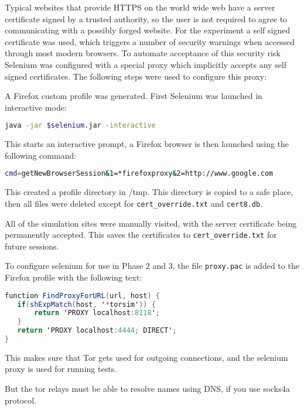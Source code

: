 Typical websites that provide HTTPS on the world wide web have a server
certificate signed by a trusted authority, so the user is not required to agree
to communicating with a possibly forged website. For the experiment a self
signed certificate was used, which triggers a number of security warnings when
accessed through most modern browsers. To automate acceptance of this security
risk Selenium was configured with a special proxy which implicitly accepts any
self signed certificates. The following steps were used to configure this proxy:

\begin{enumerate*}
  \item A Firefox custom profile was generated. First Selenium was launched in
    interactive mode:
\begin{lstlisting}[language=sh]
java -jar $selenium.jar -interactive
\end{lstlisting}
  \item This starts an interactive prompt, a Firefox browser is then launched
    using the following command:
\begin{lstlisting}[language=sh]
cmd=getNewBrowserSession&1=*firefoxproxy&2=http://www.google.com
\end{lstlisting}
  \item This created a profile directory in /tmp. This directory is copied to a
    safe place, then all files were deleted except for \verb+cert_override.txt+
    and \verb+cert8.db+.
  \item All of the simulation sites were manually visited, with the server
    certificate being permanently accepted. This saves the certificates to
    \verb+cert_override.txt+ for future sessions.
\end{enumerate*}

To configure selenium for use in Phase 2 and 3, the file \verb+proxy.pac+ is
added to the Firefox profile with the following text:

\begin{lstlisting}[language=java]
function FindProxyForURL(url, host) {
   if(shExpMatch(host, '*torsim')) {
       return 'PROXY localhost:8118';
   }
   return 'PROXY localhost:4444; DIRECT';
}
\end{lstlisting}

This makes sure that Tor gets used for outgoing connections, and the selenium
proxy is used for running tests.

But the tor relays must be able to resolve names using DNS, if you use socks4a
protocol.

